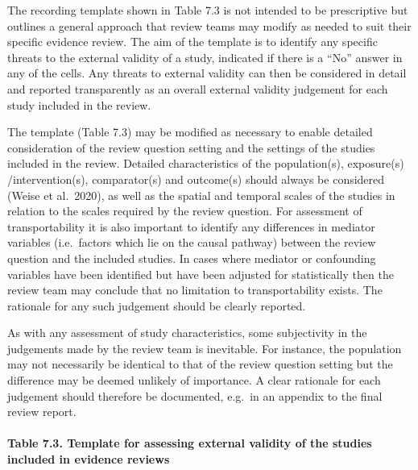 \documentclass[
  letterpaper,
  DIV=11,
  numbers=noendperiod]{scrreprt}
\makeatletter
\let\oldparagraph\paragraph
\renewcommand{\paragraph}{
    \@ifstar
      \xxxParagraphStar
      \xxxParagraphNoStar
  }
\newcommand{\xxxParagraphStar}[1]{\oldparagraph*{#1}\mbox{}}
\newcommand{\xxxParagraphNoStar}[1]{\oldparagraph{#1}\mbox{}}
\makeatother
\begin{document}
The recording template shown in Table 7.3 is not intended to be
prescriptive but outlines a general approach that review teams may
modify as needed to suit their specific evidence review. The aim of the
template is to identify any specific threats to the external validity of
a study, indicated if there is a ``No'' answer in any of the cells. Any
threats to external validity can then be considered in detail and
reported transparently as an overall external validity judgement for
each study included in the review.

The template (Table 7.3) may be modified as necessary to enable detailed
consideration of the review question setting and the settings of the
studies included in the review. Detailed characteristics of the
population(s), exposure(s) /intervention(s), comparator(s) and
outcome(s) should always be considered (Weise et al.~2020), as well as
the spatial and temporal scales of the studies in relation to the scales
required by the review question. For assessment of transportability it
is also important to identify any differences in mediator variables
(i.e.~factors which lie on the causal pathway) between the review
question and the included studies. In cases where mediator or
confounding variables have been identified but have been adjusted for
statistically then the review team may conclude that no limitation to
transportability exists. The rationale for any such judgement should be
clearly reported.

As with any assessment of study characteristics, some subjectivity in
the judgements made by the review team is inevitable. For instance, the
population may not necessarily be identical to that of the review
question setting but the difference may be deemed unlikely of
importance. A clear rationale for each judgement should therefore be
documented, e.g.~in an appendix to the final review report.

\paragraph{\texorpdfstring{\textbf{Table 7.3. Template for assessing
external validity of the studies included in evidence
reviews}}{Table 7.3. Template for assessing external validity of the studies included in evidence reviews}}\label{table-7.3.-template-for-assessing-external-validity-of-the-studies-included-in-evidence-reviews}
\end{document}
